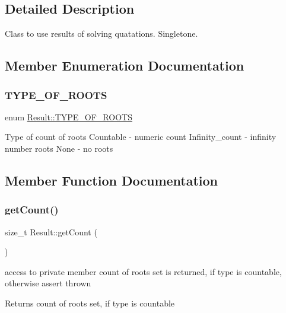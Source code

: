 \subsection{Detailed Description}
Class to use results of solving quatations. Singletone. 

\subsection{Member Enumeration Documentation}
\mbox{\label{classResult_ae4448d298878f49e7adf0c7a9908f2e5}} 
\subsubsection{\texorpdfstring{T\+Y\+P\+E\+\_\+\+O\+F\+\_\+\+R\+O\+O\+TS}{TYPE\_OF\_ROOTS}}
{\footnotesize\ttfamily enum \hyperlink{classResult_ae4448d298878f49e7adf0c7a9908f2e5}{Result\+::\+T\+Y\+P\+E\+\_\+\+O\+F\+\_\+\+R\+O\+O\+TS}}

Type of count of roots Countable -\/ numeric count Infinity\+\_\+count -\/ infinity number roots None -\/ no roots 

\subsection{Member Function Documentation}
\mbox{\label{classResult_a8975ae2fbaaf559f9db4bb52e050b294}} 
\subsubsection{\texorpdfstring{get\+Count()}{getCount()}}
{\footnotesize\ttfamily size\+\_\+t Result\+::get\+Count (\begin{DoxyParamCaption}{ }\end{DoxyParamCaption})}

access to private member count of roots set is returned, if type is countable, otherwise assert thrown \begin{DoxyReturn}{Returns}
count of roots set, if type is countable 
\end{DoxyReturn}
\mbox{\label{classResult_a96fd5f4460fb7b17a7e0e7f35c44e97c}} 
